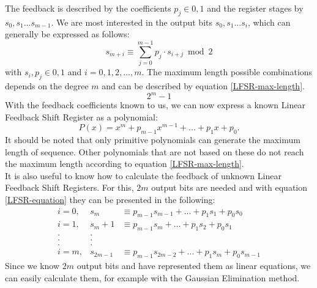 \documentclass[a4paper,twoside, openright,12pt]{report}
\begin{document}
The feedback is described by the coefficients $p_j\in{0,1}$ and the register stages by $s_0, s_1 ... s_{m-1}$. We are most interested in the output bits $s_0, s_1 ... s_i$, which can generally be expressed as follows:
\begin{equation}
s_{m+i} \equiv \sum_{j=0}^{m-1} p_j \cdot s_{i+j} \bmod 2
\label{LFSR-equation}
\end{equation}
with $s_i,p_j\in{0,1}$ and $i=0,1,2,...,m$. The maximum length possible combinations depends on the degree $m$ and can be described by equation \ref{LFSR-max-length}. 
\begin{equation}
2^m-1
\label{LFSR-max-length}
\end{equation}
With the feedback coefficients known to us, we can now express a known Linear Feedback Shift Register as a polynomial:
\begin{equation}
P(x) = x^m + p_{m-1}x^{m-1}+...+p_1x+p_0.
\label{LFSR-polynom}
\end{equation}
It should be noted that only primitive polynomials can generate the maximum length of sequence. Other polynomials that are not based on these do not reach the maximum length according to equation \ref{LFSR-max-length}.\\
It is also useful to know how to calculate the feedback of unknown Linear Feedback Shift Registers. For this, $2m$ output bits are needed and with equation \ref{LFSR-equation} they can be presented in the following:
\begin{eqnarray}
i = 0, & s_m &\equiv p_{m-1}s_{m-1}+...+p_1s_1 + p_0s_0 \nonumber \\
i = 1, & s_m+1 &\equiv p_{m-1}s_{m}+...+p_1s_2 + p_0s_1 \nonumber \\
. & . \nonumber \\
. & . \nonumber \\
. & . \nonumber \\
i = m, & s_{2m-1} &\equiv p_{m-1}s_{2m-2}+...+p_1s_m + p_0s_{m-1} \nonumber
\end{eqnarray}
Since we know $2m$ output bits and have represented them as linear equations, we can easily calculate them, for example with the Gaussian Elimination method. \cite{Tietze.2016} \cite{Paar.2016} \cite{Mishra.2016031120160312}
\end{document}
